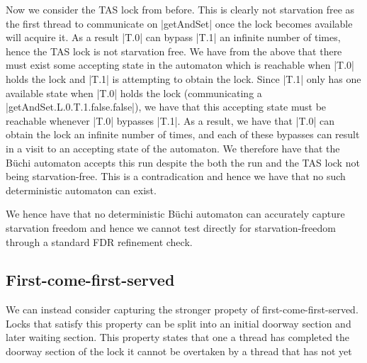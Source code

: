Now we consider the TAS lock from before. This is clearly not starvation free as the first thread to communicate on |getAndSet| once the lock becomes available will acquire it. As a result |T.0| can bypass |T.1| an infinite number of times, hence the TAS lock is not starvation free. We have from the above that there must exist some accepting state in the automaton which is reachable when |T.0| holds the lock and |T.1| is attempting to obtain the lock. Since |T.1| only has one available state when |T.0| holds the lock (communicating a |getAndSet.L.0.T.1.false.false|), we have that this accepting state must be reachable whenever |T.0| bypasses |T.1|. As a result, we have that |T.0| can obtain the lock an infinite number of times, and each of these bypasses can result in a visit to an accepting state of the automaton. We therefore have that the B{\"u}chi automaton accepts this run despite the both the run and the TAS lock not being starvation-free. This is a contradication and hence we have that no such deterministic automaton can exist.

We hence have that no deterministic B{\"u}chi automaton can accurately capture starvation freedom and hence we cannot test directly for starvation-freedom through a standard FDR refinement check.

\subsection{First-come-first-served}

We can instead consider capturing the stronger propety of first-come-first-served. Locks that satisfy this property can be split into an initial doorway section and later waiting section. This property states that one a thread has completed the doorway section of the lock it cannot be overtaken by a thread that has not yet

